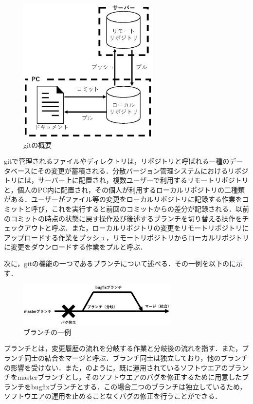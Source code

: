 \documentclass[a4paper,10pt,twocolumn]{jsarticle}
\begin{document}
\begin{figure}[h]
\centering
\includegraphics[width=70mm]{img/git.eps}
\caption{gitの概要}
\label{git}
\end{figure}

gitで管理されるファイルやディレクトリは，リポジトリと呼ばれる一種のデータベースにその変更が蓄積される．分散バージョン管理システムにおけるリポジトリには，サーバー上に配置され，複数ユーザーで利用するリモートリポジトリと，個人のPC内に配置され，その個人が利用するローカルリポジトリの二種類がある．ユーザーがファイル等の変更をローカルリポジトリに記録する作業をコミットと呼び，これを実行すると前回のコミットからの差分が記録される．以前のコミットの時点の状態に戻す操作及び後述するブランチを切り替える操作をチェックアウトと呼ぶ．また，ローカルリポジトリの変更をリモートリポジトリにアップロードする作業をプッシュ，リモートリポジトリからローカルリポジトリに変更をダウンロードする作業をプルと呼ぶ．

次に，gitの機能の一つであるブランチについて述べる．その一例を以下のに示す．

\begin{figure}[h]
\centering
\includegraphics[width=80mm]{img/branch.eps}
\caption{ブランチの一例}
\label{branch}
\end{figure}

ブランチとは，変更履歴の流れを分岐する作業と分岐後の流れを指す．また，ブランチ同士の結合をマージと呼ぶ．ブランチ同士は独立しており，他のブランチの影響を受けない．また，のように，既に運用されているソフトウエアのブランチをmasterブランチとし，そのソフトウエアのバグを修正するために用意したブランチをbugfixブランチとする．この場合二つのブランチは独立しているため，ソフトウエアの運用を止めることなくバグの修正を行うことができる．
\end{document}
